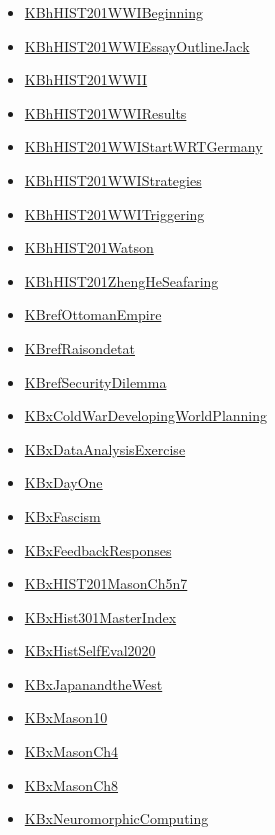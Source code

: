\documentclass[11pt]{article}
\begin{document}
\begin{itemize}
\begin{itemize}
\item \href{hist201/KBhHIST201WWIBeginning.org}{KBhHIST201WWIBeginning}
\item \href{hist201/KBhHIST201WWIEssayOutlineJack.org}{KBhHIST201WWIEssayOutlineJack}
\item \href{hist201/KBhHIST201WWII.org}{KBhHIST201WWII}
\item \href{hist201/KBhHIST201WWIResults.org}{KBhHIST201WWIResults}
\item \href{hist201/KBhHIST201WWIStartWRTGermany.org}{KBhHIST201WWIStartWRTGermany}
\item \href{hist201/KBhHIST201WWIStrategies.org}{KBhHIST201WWIStrategies}
\item \href{hist201/KBhHIST201WWITriggering.org}{KBhHIST201WWITriggering}
\item \href{hist201/KBhHIST201Watson.org}{KBhHIST201Watson}
\item \href{hist201/KBhHIST201ZhengHeSeafaring.org}{KBhHIST201ZhengHeSeafaring}
\item \href{hist201/KBrefOttomanEmpire.org}{KBrefOttomanEmpire}
\item \href{hist201/KBrefRaisondetat.org}{KBrefRaisondetat}
\item \href{hist201/KBrefSecurityDilemma.org}{KBrefSecurityDilemma}
\item \href{hist201/KBxColdWarDevelopingWorldPlanning.org}{KBxColdWarDevelopingWorldPlanning}
\item \href{hist201/KBxDataAnalysisExercise.org}{KBxDataAnalysisExercise}
\item \href{hist201/KBxDayOne.org}{KBxDayOne}
\item \href{hist201/KBxFascism.org}{KBxFascism}
\item \href{hist201/KBxFeedbackResponses.org}{KBxFeedbackResponses}
\item \href{hist201/KBxHIST201MasonCh5n7.org}{KBxHIST201MasonCh5n7}
\item \href{hist201/KBxHist301MasterIndex.org}{KBxHist301MasterIndex}
\item \href{hist201/KBxHistSelfEval2020.org}{KBxHistSelfEval2020}
\item \href{hist201/KBxJapanandtheWest.org}{KBxJapanandtheWest}
\item \href{hist201/KBxMason10.org}{KBxMason10}
\item \href{hist201/KBxMasonCh4.org}{KBxMasonCh4}
\item \href{hist201/KBxMasonCh8.org}{KBxMasonCh8}
\item \href{hist201/KBxNeuromorphicComputing.org}{KBxNeuromorphicComputing}

\end{itemize}
\end{itemize}
\end{document}
